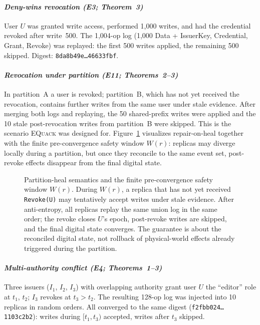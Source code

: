 \documentclass[10pt,journal,compsoc]{IEEEtran}
\newcommand{\equack}{\textsc{EQuack}}
\begin{document}
\paragraph*{\textit{Deny-wins revocation (E3; Theorem~3)}}
User $U$ was granted write access, performed 1{,}000 writes, and had the credential revoked after write~500. The 1{,}004-op log (1{,}000 Data + IssuerKey, Credential, Grant, Revoke) was replayed: the first 500 writes applied, the remaining 500 skipped. Digest: \texttt{\small 8da8b49e\ldots 46633fbf}.

\paragraph*{\textit{Revocation under partition (E11; Theorems~2--3)}}
In partition~A a user is revoked; partition~B, which has not yet received the revocation, contains further writes from the same user under stale evidence. After merging both logs and replaying, the 50 shared-prefix writes were applied and the 10 stale post-revocation writes from partition~B were skipped. This is the scenario \equack{} was designed for.
Figure~\ref{fig:partition-heal-paperC} visualizes repair-on-heal together with the finite pre-convergence safety window $W(r)$: replicas may diverge locally during a partition, but once they reconcile to the same event set, post-revoke effects disappear from the final digital state.

\begin{figure}[t]
\centering
\resizebox{\textwidth}{!}{}
\caption{Partition-heal semantics and the finite pre-convergence safety window $W(r)$. During $W(r)$, a replica that has not yet received \texttt{Revoke(U)} may tentatively accept writes under stale evidence. After anti-entropy, all replicas replay the same union log in the same order; the revoke closes $U$'s epoch, post-revoke writes are skipped, and the final digital state converges. The guarantee is about the reconciled digital state, not rollback of physical-world effects already triggered during the partition.}
\label{fig:partition-heal-paperC}
\end{figure}

\paragraph*{\textit{Multi-authority conflict (E4; Theorems~1--3)}}
Three issuers ($I_1$, $I_2$, $I_3$) with overlapping authority grant user $U$ the ``editor'' role at $t_1$, $t_2$; $I_3$ revokes at $t_3>t_2$. The resulting 128-op log was injected into 10 replicas in random orders. All converged to the same digest (\texttt{\small f2fbb024\ldots 1103c2b2}): writes during $[t_1,t_3)$ accepted, writes after $t_3$ skipped.
\end{document}
